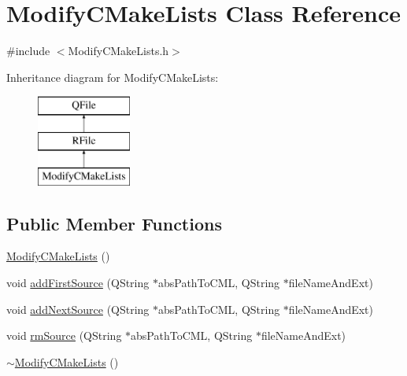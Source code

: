 \hypertarget{class_modify_c_make_lists}{\section{Modify\-C\-Make\-Lists Class Reference}
\label{class_modify_c_make_lists}
}


{\ttfamily \#include $<$Modify\-C\-Make\-Lists.\-h$>$}

Inheritance diagram for Modify\-C\-Make\-Lists\-:\begin{figure}[H]
\begin{center}
\leavevmode
\includegraphics[height=3.000000cm]{class_modify_c_make_lists}
\end{center}
\end{figure}
\subsection*{Public Member Functions}
\begin{DoxyCompactItemize}
\item 
\hyperlink{class_modify_c_make_lists_ace8915c7f1b04ca43ae0a4779ede897b}{Modify\-C\-Make\-Lists} ()
\item 
void \hyperlink{class_modify_c_make_lists_a617b0b2f6ee01ea95c368b244eb488d7}{add\-First\-Source} (Q\-String $\ast$abs\-Path\-To\-C\-M\-L, Q\-String $\ast$file\-Name\-And\-Ext)
\item 
void \hyperlink{class_modify_c_make_lists_a4730b6122bc5c487e00735335394ad47}{add\-Next\-Source} (Q\-String $\ast$abs\-Path\-To\-C\-M\-L, Q\-String $\ast$file\-Name\-And\-Ext)
\item 
void \hyperlink{class_modify_c_make_lists_a09c8e05eb646eb8849e2c12406287524}{rm\-Source} (Q\-String $\ast$abs\-Path\-To\-C\-M\-L, Q\-String $\ast$file\-Name\-And\-Ext)
\item 
\hyperlink{class_modify_c_make_lists_a1d568b4e7b790c3637545cb0e53f4115}{$\sim$\-Modify\-C\-Make\-Lists} ()
\end{DoxyCompactItemize}


